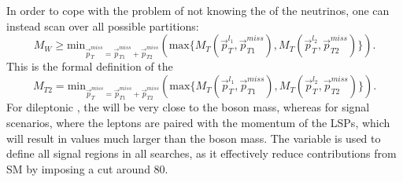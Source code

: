 In order to cope with the problem of not knowing the \pt of the neutrinos, one can instead scan over all possible \ptmiss partitions: 
\begin{equation}
M_{W}\geq \mathrm{min}_{\vec{p}_{T}^{miss}=\vec{p}_{T1}^{miss}+\vec{p}_{T2}^{miss}}\left( \mathrm{max}\{M_{T}\left(\vec{p}_{T}^{l_{1}},\vec{p}_{T1}^{miss}\right), M_{T}\left(\vec{p}_{T}^{l_{2}},\vec{p}_{T2}^{miss}\right)\}\right).
\end{equation}
This is the formal definition of the \mttwo 
\begin{equation}
M_{T2}= \mathrm{min}_{\vec{p}_{T}^{miss}=\vec{p}_{T1}^{miss}+\vec{p}_{T2}^{miss}}\left( \mathrm{max}\{M_{T}\left(\vec{p}_{T}^{l_{1}},\vec{p}_{T1}^{miss}\right), M_{T}\left(\vec{p}_{T}^{l_{2}},\vec{p}_{T2}^{miss}\right)\}\right).
\end{equation}
For dileptonic \ttbar, the \mttwo will be very close to the \PW boson mass, whereas for signal scenarios, where the leptons are paired with the momentum of the LSPs, which will result in values much larger than the \PW boson mass. 
The \mttwo variable is used to define all signal regions in all searches, as it effectively reduce contributions from SM \ttbar by imposing a cut around 80\GeV.
